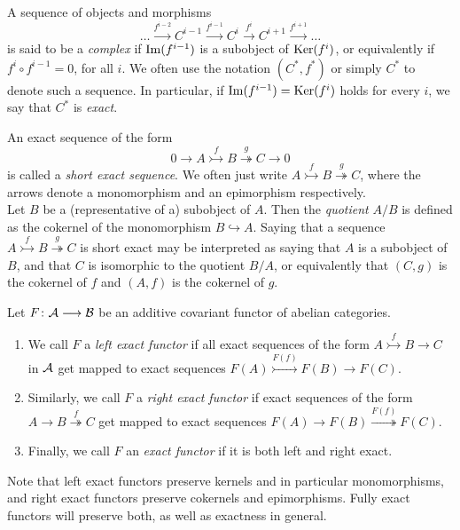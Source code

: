\documentclass[a4paper]{article}
\def\into{\hookrightarrow}
\def\mono{\rightarrowtail}
\def\epi{\twoheadrightarrow}
\begin{document}
A sequence of objects and morphisms
\[
    \dots \stackrel{f^{i-2}}{\to} C^{i-1} \stackrel{f^{i-1}}{\to} C^{i} \stackrel{f^{i}}{\to} C^{i+1} \stackrel{f^{i+1}}{\to} \dots
\]
is said to be a \emph{complex} if $\operatorname{Im}(f^{i-1})$ is a subobject of $\operatorname{Ker}(f^i)$, or equivalently if $f^{i} \circ f^{i-1} = 0$, for all $i$. We often use the notation $(C^*, f^*)$ or simply $C^*$ to denote such a sequence. In particular, if $\operatorname{Im}(f^{i-1}) = \operatorname{Ker}(f^i)$ holds for every $i$, we say that $C^*$ is \emph{exact}.

An exact sequence of the form
\[
    0 \to A \stackrel{f}{\mono} B \stackrel{g}{\epi} C \to 0
\]
is called a \emph{short exact sequence}. We often just write $A \stackrel{f}{\mono} B \stackrel{g}{\epi} C$, where the arrows denote a monomorphism and an epimorphism respectively.\\

Let $B$ be a (representative of a) subobject of $A$. Then the \emph{quotient} $A/B$ is defined as the cokernel of the monomorphism $B\into A$. Saying that a sequence $A \stackrel{f}{\mono} B \stackrel{g}{\epi} C$ is short exact may be interpreted as saying that $A$ is a subobject of $B$, and that $C$ is isomorphic to the quotient $B/A$, or equivalently that $(C,g)$ is the cokernel of $f$ and $(A,f)$ is the cokernel of $g$.\\

\begin{Definition}
    Let $F\colon\mathcal{A}\longrightarrow \mathcal{B}$ be an additive covariant functor of abelian categories.
    \begin{enumerate}
        \item We call $F$ a \emph{left exact functor} if all exact sequences of the form $A \stackrel{f}{\mono} B \to C$ in $\mathcal{A}$ get mapped to exact sequences $F(A) \stackrel{F(f)}{\mono} F(B) \to F(C)$.
        \item Similarly, we call $F$ a \emph{right exact functor} if exact sequences of the form $A \to B \stackrel{f}{\epi} C$ get mapped to exact sequences $F(A) \to F(B) \stackrel{F(f)}{\epi} F(C)$.
        \item Finally, we call $F$ an \emph{exact functor} if it is both left and right exact.
    \end{enumerate}
\end{Definition}
Note that left exact functors preserve kernels and in particular monomorphisms, and right exact functors preserve cokernels and epimorphisms. Fully exact functors will preserve both, as well as exactness in general.\\
\end{document}
